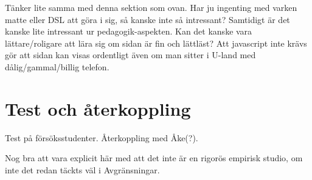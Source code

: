 \begin{binge}
  Tänker lite samma med denna sektion som ovan. Har ju ingenting med
  varken matte eller DSL att göra i sig, så kanske inte så intressant?
  Samtidigt är det kanske lite intressant ur pedagogik-aspekten. Kan det
  kanske vara lättare/roligare att lära sig om sidan är fin och
  lättläst? Att javascript inte krävs gör att sidan kan visas ordentligt
  även om man sitter i U-land med dålig/gammal/billig telefon.

  \section{Test och återkoppling}


  Test på försöksstudenter. Återkoppling med Åke(?).

  Nog bra att vara explicit här med att det inte är en rigorös empirisk
  studio, om inte det redan täckts väl i Avgränsningar.

\end{binge}